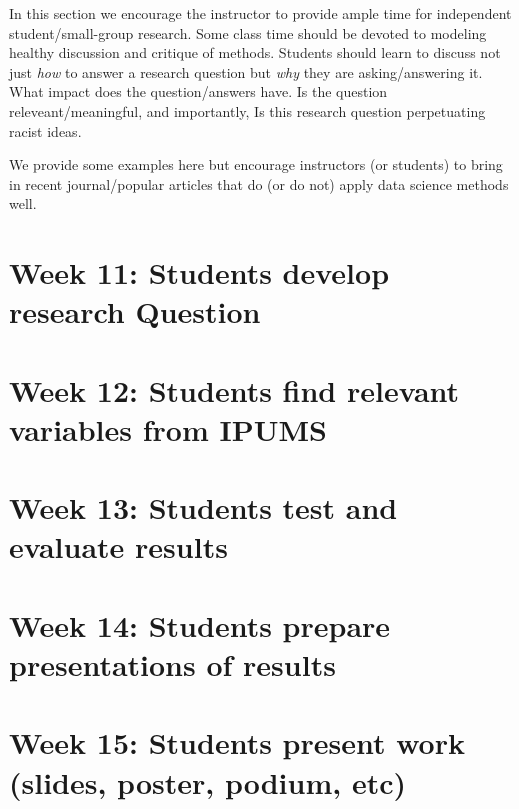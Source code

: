 \documentclass[
]{book}
\begin{document}
In this section we encourage the instructor to provide ample time for independent student/small-group research. Some class time should be devoted to modeling healthy discussion and critique of methods. Students should learn to discuss not just \emph{how} to answer a research question but \emph{why} they are asking/answering it. What impact does the question/answers have. Is the question releveant/meaningful, and importantly, Is this research question perpetuating racist ideas.

We provide some examples here but encourage instructors (or students) to bring in recent journal/popular articles that do (or do not) apply data science methods well.

\hypertarget{week-11-students-develop-research-question-1}{%
\section{Week 11: Students develop research Question}\label{week-11-students-develop-research-question-1}}

\hypertarget{week-12-students-find-relevant-variables-from-ipums-1}{%
\section{Week 12: Students find relevant variables from IPUMS}\label{week-12-students-find-relevant-variables-from-ipums-1}}

\hypertarget{week-13-students-test-and-evaluate-results-1}{%
\section{Week 13: Students test and evaluate results}\label{week-13-students-test-and-evaluate-results-1}}

\hypertarget{week-14-students-prepare-presentations-of-results-1}{%
\section{Week 14: Students prepare presentations of results}\label{week-14-students-prepare-presentations-of-results-1}}

\hypertarget{week-15-students-present-work-slides-poster-podium-etc-1}{%
\section{Week 15: Students present work (slides, poster, podium, etc)}\label{week-15-students-present-work-slides-poster-podium-etc-1}}
\end{document}
